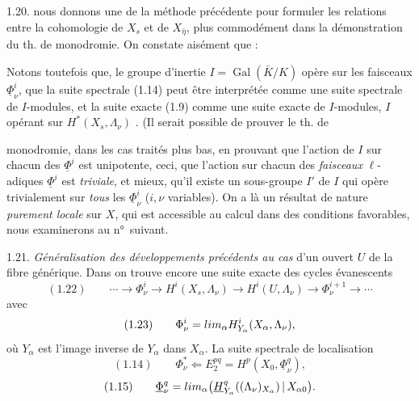 \documentclass[11pt,a4paper]{article}
\begin{document}
1.20.  \struck{\ill{}} nous donnons   une   de la méthode précédente pour formuler les relations entre la cohomologie de $X_s$ et de $X_{\bar\eta}$,  plus commodément dans la démonstration  du th. de monodromie. On constate aisément que :

Notons toutefois que,  le groupe d'inertie $I = \operatorname{Gal}(\bar K/K)$ opère sur les faisceaux $\underline{\Phi}^i_\nu$, que la suite spectrale (1.14) peut être interprétée comme une suite spectrale de $I$-modules, et la suite exacte (1.9) comme une suite exacte de $I$-modules, \struck{\ill{}} $I$ opérant  \struck{\ill{} \ill{}} sur $H^*(X_s, \Lambda_\nu)$ . (Il serait possible de prouver le th. de


monodromie, dans les cas \struck{\ill{}} traités plus bas, en prouvant que l'action de $I$ sur chacun des $\underline{\Phi}^i$ est  \add{\ill{}} unipotente, \struck{\ill{}}   ceci, que  l'action sur chacun des \emph{faisceaux} $\ell$-adiques $\underline{\Phi}^i$ est \struck{\ill{}} \emph{} \emph{triviale}, et mieux, qu'il existe un sous-groupe  $I'$ de $I$ qui opère \struck{\ill{}} trivialement sur \emph{tous} les \struck{\ill{}} $\underline{\Phi}^i_\nu$ ($i, \nu$ variables).  On a là un résultat de nature \emph{purement locale} sur $X$, qui est accessible au calcul dans des conditions favorables,  nous examinerons au n°~suivant.

1.21. \emph{Généralisation des développements précédents au cas} d'un ouvert $U$ de la fibre générique.  Dans  on trouve encore une suite exacte des cycles évanescents
\[
(1.22) \qquad \cdots \to \Phi^i_\nu \to H^i(X_s, \Lambda_\nu) \to H^i(U, \Lambda_\nu) \to \Phi^{i+1}_\nu \to \cdots
\]
avec
\[
(1.23) \qquad \Phi^i_\nu = \varinjlim_\alpha H^i_{Y_\alpha}(X_\alpha, \Lambda_\nu) ,
\]
où $Y_\alpha$ est l'image inverse de $Y_\alpha$ dans $X_\alpha$. La suite spectrale de localisation 
\[
(1.14) \qquad \Phi^*_\nu \Longleftarrow E_2^{pq} = H^p(X_0, \underline{\Phi}^q_\nu) ,
\]
\[
(1.15) \qquad \underline{\Phi}^q_\nu = \varinjlim_\alpha \bigl(\underline{H}^q_{Y_\alpha}((\Lambda_\nu)_{X_\alpha}) \,|\, X_{\alpha 0}\bigr) .
\]
\end{document}

